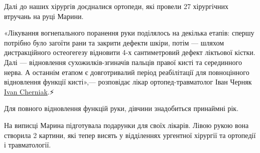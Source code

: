 
Далі до наших хірургів доєдналися ортопеди, які провели 27 хірургічних втручань
на руці Марини.🙌🏻

«Лікування вогнепального поранення руки поділялось на декілька етапів: спершу
потрібно було загоїти рани та закрити дефекти шкіри, потім — шляхом
дистракційного остеогегезу відновити 4-х сантиметровий дефект ліктьової кістки.
Далі — відновлення сухожилків-згиначів пальців правої кисті та серединного
нерва. А останнім етапом є довготривалий період реабілітації для повноцінного
відновлення функції кисті»,— розповідає лікар ортопед-травматолог Іван Черняк
\href{https://www.facebook.com/ivan.s.cherniak}{Ivan Cherniak}.⚡️


Для повного відновлення функцій руки, дівчини знадобиться принаймні рік.

На виписці Марина підготувала подарунки для своїх лікарів. Лівою рукою вона
створила 2 картини, які тепер висять у відділеннях ургентної хірургії та
ортопедії і травматології.💛


